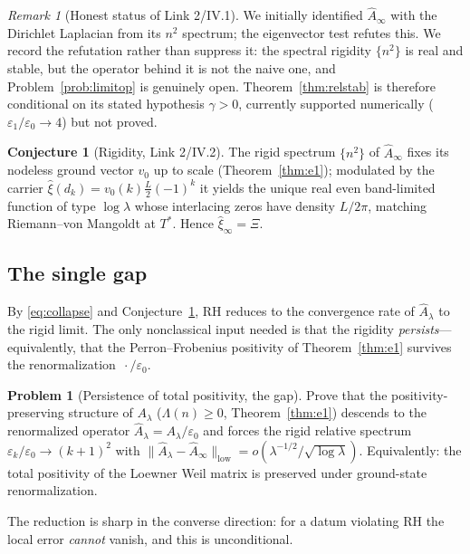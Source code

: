 \documentclass[11pt]{amsart}
\theoremstyle{definition}
\newtheorem{problem}[theorem]{Problem}
\newtheorem{conjecture}[theorem]{Conjecture}
\theoremstyle{remark}
\newtheorem{remark}[theorem]{Remark}
\newcommand{\RH}{\mathrm{RH}}
\newcommand{\xih}{\widehat{\xi}}
\newcommand{\Ah}{\widehat{A}}
\newcommand{\Lam}{\Lambda}
\begin{document}
\begin{remark}[Honest status of Link 2/IV.1]
We initially identified $\Ah_\infty$ with the Dirichlet Laplacian from its
$n^2$ spectrum; the eigenvector test refutes this. We record the refutation
rather than suppress it: the spectral rigidity $\{n^2\}$ is real and stable,
but the operator behind it is not the naive one, and Problem~\ref{prob:limitop}
is genuinely open. Theorem~\ref{thm:relstab} is therefore conditional on its
stated hypothesis $\gamma>0$, currently supported numerically
($\varepsilon_1/\varepsilon_0\to4$) but not proved.
\end{remark}

\begin{conjecture}[Rigidity, Link 2/IV.2]\label{conj:rigid}
The rigid spectrum $\{n^2\}$ of $\Ah_\infty$ fixes its nodeless ground vector
$v_0$ up to scale (Theorem~\ref{thm:e1}); modulated by the carrier
$\xih(d_k)=v_0(k)\tfrac L2(-1)^k$ it yields the unique real even band-limited
function of type $\log\lambda$ whose interlacing zeros have density $L/2\pi$,
matching Riemann--von Mangoldt at $T^\ast$. Hence $\xih_\infty=\Xi$.
\end{conjecture}

\subsection{The single gap}\label{sec:gap}
By \eqref{eq:collapse} and Conjecture~\ref{conj:rigid}, $\RH$ reduces to the
convergence rate of $\Ah_\lambda$ to the rigid limit. The only nonclassical
input needed is that the rigidity \emph{persists}---equivalently, that the
Perron--Frobenius positivity of Theorem~\ref{thm:e1} survives the
renormalization $\,\cdot/\varepsilon_0$.

\begin{problem}[Persistence of total positivity, the gap]\label{prob:gap}
Prove that the positivity-preserving structure of $A_\lambda$
($\Lam(n)\geq0$, Theorem~\ref{thm:e1}) descends to the renormalized operator
$\Ah_\lambda=A_\lambda/\varepsilon_0$ and forces the rigid relative spectrum
$\varepsilon_k/\varepsilon_0\to(k+1)^2$ with
$\|\Ah_\lambda-\Ah_\infty\|_{\mathrm{low}}
=o(\lambda^{-1/2}/\sqrt{\log\lambda})$. Equivalently: the total positivity of
the Loewner Weil matrix is preserved under ground-state renormalization.
\end{problem}

The reduction is sharp in the converse direction: for a datum violating $\RH$
the local error \emph{cannot} vanish, and this is unconditional.
\end{document}
